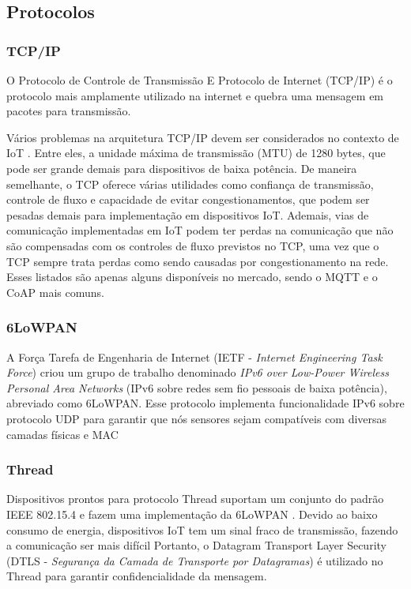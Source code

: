 \documentclass[tcc,capa]{texufpel}
\begin{document}
\subsection{Protocolos}

\subsubsection{TCP/IP}
O Protocolo de Controle de Transmissão E Protocolo de Internet (TCP/IP) é o protocolo mais amplamente utilizado na internet e quebra uma mensagem em pacotes para transmissão.

Vários problemas na arquitetura TCP/IP devem ser considerados no contexto de IoT \cite{schiller}. Entre eles, a unidade máxima de transmissão (MTU) de 1280 bytes, que pode ser grande demais para dispositivos de baixa potência. De maneira semelhante, o TCP oferece várias utilidades como confiança de transmissão, controle de fluxo e capacidade de evitar congestionamentos, que podem ser pesadas demais para implementação em dispositivos IoT. Ademais, vias de comunicação implementadas em IoT podem ter perdas na comunicação que não são compensadas com os controles de fluxo previstos no TCP, uma vez que o TCP sempre trata perdas como sendo causadas por congestionamento na rede. Esses listados são apenas alguns disponíveis no mercado, sendo o MQTT e o CoAP mais comuns.

\subsubsection{6LoWPAN}

A Força Tarefa de Engenharia de Internet (IETF - \textit{Internet Engineering Task Force}) criou um grupo de trabalho denominado \textit{IPv6 over Low-Power Wireless Personal Area Networks} (IPv6 sobre redes sem fio pessoais de baixa potência), abreviado como 6LoWPAN. Esse protocolo implementa funcionalidade IPv6 sobre protocolo UDP para garantir que nós sensores sejam compatíveis com diversas camadas físicas e MAC \cite{schiller}

\subsubsection{Thread}
Dispositivos prontos para protocolo Thread suportam um conjunto do padrão IEEE 802.15.4 e fazem uma implementação da 6LoWPAN \cite{schiller}. Devido ao baixo consumo de energia, dispositivos IoT tem um sinal fraco de transmissão, fazendo a comunicação ser mais difícil Portanto, o Datagram Transport Layer Security (DTLS - \textit{Segurança da Camada de Transporte por Datagramas}) é utilizado no Thread para garantir confidencialidade da mensagem.
\end{document}
